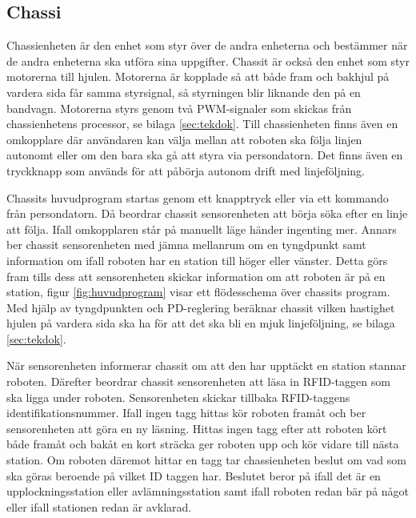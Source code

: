 
\subsection{Chassi}

Chassienheten är den enhet som styr över de andra enheterna och bestämmer när de andra enheterna ska utföra sina uppgifter. Chassit är också den enhet som styr motorerna till hjulen. Motorerna är kopplade så att både fram och bakhjul på vardera sida får samma styrsignal, så styrningen blir liknande den på en bandvagn. Motorerna styrs genom två PWM-signaler som skickas från chassienhetens processor, se bilaga \ref{sec:tekdok}. Till chassienheten finns även en omkopplare där användaren kan välja mellan att roboten ska följa linjen autonomt eller om den bara ska gå att styra via persondatorn. Det finns även en tryckknapp som används för att påbörja autonom drift med linjeföljning.

Chassits huvudprogram startas genom ett knapptryck eller via ett kommando från persondatorn. Då beordrar chassit sensorenheten att börja söka efter en linje att följa. Ifall omkopplaren står på manuellt läge händer ingenting mer. Annars ber chassit sensorenheten med jämna mellanrum om en tyngdpunkt samt information om ifall roboten har en station till höger eller vänster. Detta görs fram tills dess att sensorenheten skickar information om att roboten är på en station, figur \ref{fig:huvudprogram} visar ett flödesschema över chassits program. Med hjälp av tyngdpunkten och PD-reglering beräknar chassit vilken hastighet hjulen på vardera sida ska ha för att det ska bli en mjuk linjeföljning, se bilaga \ref{sec:tekdok}. 



När sensorenheten informerar chassit om att den har upptäckt en station stannar roboten. Därefter beordrar chassit sensorenheten att läsa in RFID-taggen som ska ligga under roboten. Sensorenheten skickar tillbaka RFID-taggens identifikationsnummer. Ifall ingen tagg hittas kör roboten framåt och ber sensorenheten att göra en ny läsning. Hittas ingen tagg efter att roboten kört både framåt och bakåt en kort sträcka ger roboten upp och kör vidare till nästa station. Om roboten däremot hittar en tagg tar chassienheten beslut om vad som ska göras beroende på vilket ID taggen har. Beslutet beror på ifall det är en upplockningsstation eller avlämningsstation samt ifall roboten redan bär på något eller ifall stationen redan är avklarad. 

